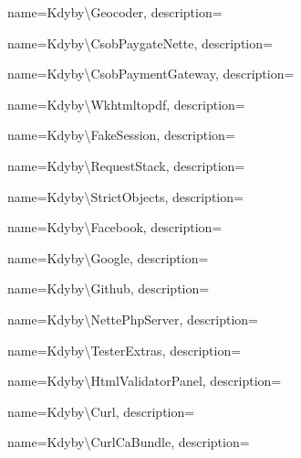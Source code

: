  {
  name={Kdy\-by\textbackslash{}Geo\-co\-der},
  description={} }

 {
  name={Kdy\-by\textbackslash{}Csob\-Pay\-gate\-Nette},
  description={} }

 {
  name={Kdy\-by\textbackslash{}Csob\-Pay\-me\-nt\-Ga\-te\-way},
  description={} }

 {
  name={Kdy\-by\textbackslash{}Wk\-html\-to\-pdf},
  description={} }

 {
  name={Kdy\-by\textbackslash{}Fa\-ke\-Ses\-si\-on},
  description={} }

 {
  name={Kdy\-by\textbackslash{}Re\-que\-st\-Sta\-ck},
  description={} }

 {
  name={Kdy\-by\textbackslash{}Stri\-ct\-Ob\-je\-ct\-s},
  description={} }

 {
  name={Kdy\-by\textbackslash{}Fa\-ce\-book},
  description={} }

 {
  name={Kdy\-by\textbackslash{}Google},
  description={} }

 {
  name={Kdy\-by\textbackslash{}Git\-hub},
  description={} }

 {
  name={Kdy\-by\textbackslash{}Nette\-Php\-Ser\-ver},
  description={} }

 {
  name={Kdy\-by\textbackslash{}Tes\-ter\-Ex\-tras},
  description={} }

 {
  name={Kdy\-by\textbackslash{}Html\-Va\-li\-da\-tor\-Pa\-nel},
  description={} }

 {
  name={Kdy\-by\textbackslash{}Curl},
  description={} }

 {
  name={Kdy\-by\textbackslash{}Curl\-Ca\-Bund\-le},
  description={} }

